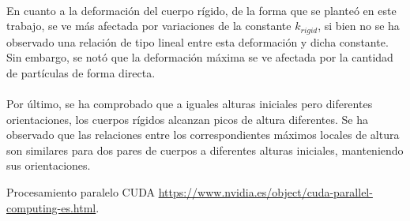 \documentclass[12pt, twocolumn]{article}
\begin{document}
	\paragraph{} En cuanto a la deformación del cuerpo rígido, de la forma que se planteó en este trabajo, se ve más afectada por variaciones de la constante $k_{rigid}$, si bien no se ha observado una relación de tipo lineal entre esta deformación y dicha constante. Sin embargo, se notó que la deformación máxima se ve afectada por la cantidad de partículas de forma directa.
	
	\paragraph{} Por último, se ha comprobado que a iguales alturas iniciales pero diferentes orientaciones, los cuerpos rígidos alcanzan picos de altura diferentes. Se ha observado que las relaciones entre los correspondientes máximos locales de altura son similares para dos pares de cuerpos a diferentes alturas iniciales, manteniendo sus orientaciones. 

    \begin{thebibliography}{9}
        Procesamiento paralelo CUDA
        \url{https://www.nvidia.es/object/cuda-parallel-computing-es.html}.
        
	\end{thebibliography}
	
\end{document}
